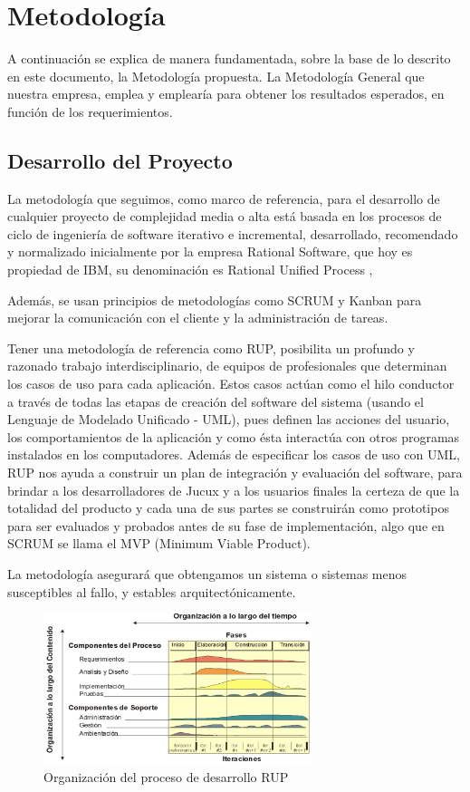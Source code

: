 \section{Metodología}

A continuación se explica de manera fundamentada, sobre la base de lo descrito en este documento, la Metodología propuesta. La Metodología General que nuestra empresa, emplea y emplearía para obtener los resultados esperados, en función de los requerimientos.

\subsection{Desarrollo del Proyecto}

La metodología que seguimos, como marco de referencia, para el desarrollo de cualquier proyecto de complejidad media o alta está basada en los procesos de ciclo de ingeniería de software iterativo e incremental, desarrollado, recomendado y normalizado inicialmente por la empresa Rational Software, que hoy es propiedad de IBM, su denominación es Rational Unified Process , 

Además, se usan principios de metodologías como SCRUM y Kanban para mejorar la comunicación con el cliente y la administración de tareas.

Tener una metodología de referencia como RUP, posibilita un profundo y razonado trabajo interdisciplinario, de equipos de profesionales que determinan los casos de uso para cada aplicación. 
Estos casos actúan como el hilo conductor a través de todas las etapas de creación del software del sistema (usando el Lenguaje de Modelado Unificado - UML), 
pues definen las acciones del usuario, los comportamientos de la aplicación y como ésta interactúa con otros programas instalados en los computadores. 
Además de especificar los casos de uso con UML, RUP nos ayuda a construir un plan de integración y evaluación del software, para brindar a los desarrolladores de Jucux y a los usuarios finales la certeza de que la totalidad del producto y cada una de sus partes se construirán como prototipos para ser evaluados y probados antes de su fase de implementación, algo que en SCRUM se llama el MVP (Minimum Viable Product). 

La metodología asegurará que obtengamos un sistema o sistemas menos susceptibles al fallo, y estables arquitectónicamente.

\begin{figure}[htbp]
    \centering
    \includegraphics[width=0.7\textwidth]{assets/RUPGRAPH.JPG}
    \caption{Organización del proceso de desarrollo RUP }
    \label{fig:rupgraph}
\end{figure}

